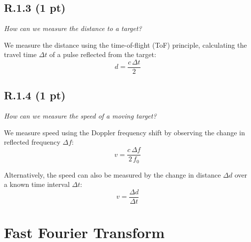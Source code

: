 \documentclass{article}
\begin{document}

\subsection*{R.1.3 (1 pt)}
\emph{How can we measure the distance to a target?}

We measure the distance using the time-of-flight (ToF) principle, calculating the travel time $\Delta t$ of a pulse reflected from the target:
\[
d = \frac{c\,\Delta t}{2}
\]


\subsection*{R.1.4 (1 pt)}
\emph{How can we measure the speed of a moving target?}

We measure speed using the Doppler frequency shift by observing the change in reflected frequency $\Delta f$:
\[
v = \frac{c\,\Delta f}{2\,f_0}
\]

Alternatively, the speed can also be measured by the change in distance $\Delta d$ over a known time interval $\Delta t$:
\[
v = \frac{\Delta d}{\Delta t}
\]

\section{Fast Fourier Transform}
\end{document}
